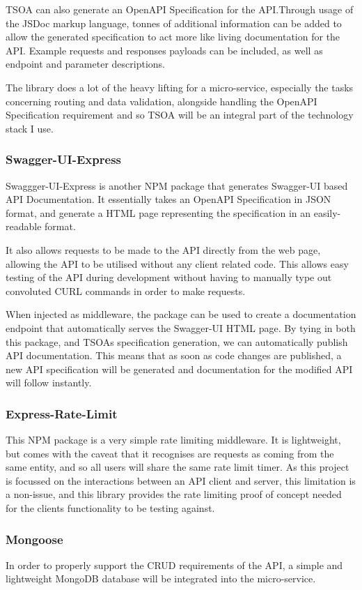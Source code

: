 TSOA can also generate an OpenAPI Specification for the API.Through usage of the JSDoc markup language, tonnes of additional information can be added to allow the generated specification to act more like living documentation for the API. Example requests and responses payloads can be included, as well as endpoint and parameter descriptions.

The library does a lot of the heavy lifting for a micro-service, especially the tasks concerning routing and data validation, alongside handling the OpenAPI Specification requirement and so TSOA will be an integral part of the technology stack I use.
\subsubsection{Swagger-UI-Express}
Swaggger-UI-Express is another NPM package that generates Swagger-UI based API Documentation. It essentially takes an OpenAPI Specification in JSON format, and generate a HTML page representing the specification in an easily-readable format.

It also allows requests to be made to the API directly from the web page, allowing the API to be utilised without any client related code. This allows easy testing of the API during development without having to manually type out convoluted CURL commands in order to make requests.

When injected as middleware, the package can be used to create a documentation endpoint that automatically serves the Swagger-UI HTML page. By tying in both this package, and TSOAs specification generation, we can automatically publish API documentation. This means that as soon as code changes are published, a new API specification will be generated  and documentation for the modified API will follow instantly.
\subsubsection{Express-Rate-Limit}
This NPM package is a very simple rate limiting middleware. It is lightweight, but comes with the caveat that it recognises are requests as coming from  the same entity, and so all users will share the same rate limit timer. As this project is focussed on the interactions between an API client and server, this limitation is a non-issue, and this library provides the rate limiting proof of concept needed for the clients functionality to be testing against.
\subsubsection{Mongoose}
In order to properly support the CRUD requirements of the API, a simple and lightweight MongoDB database will be integrated into the micro-service.


